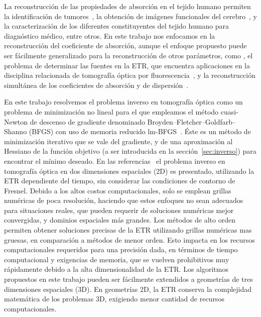  La reconstrucción de las propiedades de absorción en el tejido humano permiten la identificación de tumores~\cite{Zhu2005, Zhu2010, Fujii2016b},
 la obtención de imágenes funcionales del cerebro~\cite{Boas2001, bluestone2001, Arridge1999}, y la caracterización de los diferentes
 constituyentes del tejido humano para diagnóstico médico, entre otros. En este trabajo nos enfocamos en
 la reconstrucción del coeficiente de absorción, aunque
 el enfoque propuesto puede ser fácilmente generalizado para la reconstrucción 
 de otros parámetros, como \eg, el problema de determinar las fuentes en la ETR,
 que encuentra aplicaciones en la disciplina relacionada de
 tomografía óptica por fluorescencia~\cite{Klose2005,Klose2010, Ren2010}, y la reconstrucción 
 simultánea de los coeficientes de absorción y de dispersión~\cite{Ren2006,Prieto2017}.

 En este trabajo resolvemos el problema inverso en tomografía óptica como un problema 
 de minimización no lineal para el que empleamos
 el método cuasi-Newton de descenso de gradiente denominado 
 Broyden–Fletcher–Goldfarb–Shanno (BFGS) con uso de memoria reducido lm-BFGS~\cite{Byrd1995}. Éste es un método de minimización iterativo 
 que se vale del gradiente, y de una aproximación 
 al Hessiano de la función objetivo (a ser 
 introducida en la sección~\ref{sec:inverso}) para encontrar el mínimo deseado. En las referencias~\cite{Prieto2017,Boulanger2005} 
 el problema inverso en tomografía óptica en dos dimensiones espaciales (2D)
es presentado, utilizando la ETR dependiente del tiempo, sin considerar las condiciones de contorno de Fresnel. Debido a los altos costos computacionales,
 solo se emplean grillas numéricas de poca resolución,
 haciendo que estos enfoques no sean adecuados para situaciones reales, que pueden requerir
 de soluciones numéricas mejor convergidas, y dominios espaciales más grandes. 
 Los métodos de alto orden
 permiten obtener soluciones precisas de la ETR
 utilizando grillas numéricas mas gruesas, en comparación a métodos de menor orden. Esto impacta en los recursos computacionales requeridos para una precisión dada, en términos de tiempo computacional y exigencias de memoria, que se vuelven prohibitivos muy rápidamente debido a la alta dimensionalidad de la ETR. Los algoritmos propuestos 
 en este trabajo pueden ser fácilmente extendidos a geometrías de tres dimensiones espaciales (3D). En geometrías 2D, la ETR
 conserva la complejidad matemática de los problemas 3D, 
 exigiendo menor cantidad de recursos computacionales.

